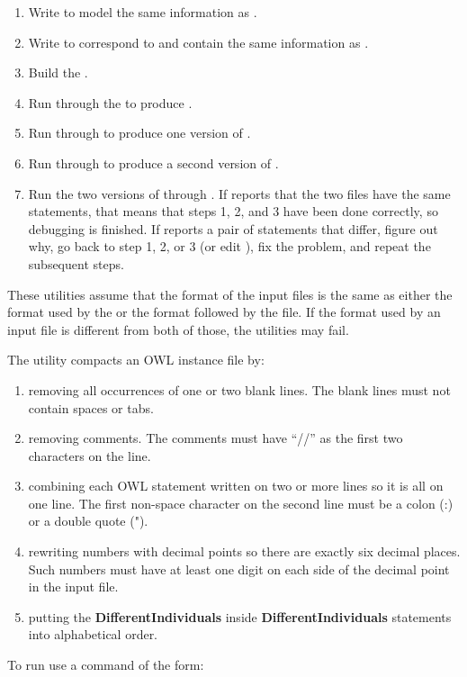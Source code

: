\begin{enumerate}
\item Write  to model the same information as .

\item Write  to correspond to  and contain the
same information as .

\item Build the .

\item Run  through the  to produce
.

\item Run  through  to produce
one version of .

\item Run  through  to produce
a second version of .

\item Run the two versions of  through
. If  reports that the two files have the same
statements, that means that steps 1, 2, and 3 have been done correctly, so
debugging is finished. If  reports a pair of statements that
differ, figure out why, go back to step 1, 2, or 3 (or edit
), fix the problem, and repeat the subsequent steps.
\end{enumerate}

These utilities assume that the format of the input files is the same
as either the format used by the  or the format followed by
the  file. If the format used by an input file is
different from both of those, the utilities may fail.

The  utility compacts an OWL instance file by:
\begin{enumerate}
\item removing all occurrences of one or two blank lines. The blank lines
   must not contain spaces or tabs.
\item removing comments. The comments must have ``//'' as the first two
   characters on the line.
\item combining each OWL statement written on two or more lines so it is
   all on one line. The first non-space character on the second line
   must be a colon (:) or a double quote (").
\item rewriting numbers with decimal points so there are exactly six decimal
   places. Such numbers must have at least one digit on each side of the
   decimal point in the input file.
\item putting the \textbf{DifferentIndividuals} inside \textbf{DifferentIndividuals} statements
   into alphabetical order.
\end{enumerate}
To run  use a command of the form:\\

